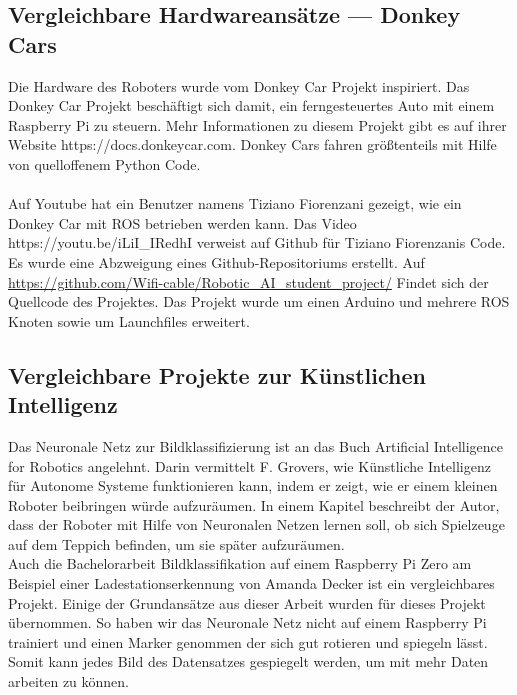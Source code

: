 \documentclass[conference]{IEEEtran}
\begin{document}
	\subsection{Vergleichbare Hardwareansätze — Donkey Cars} %
	Die Hardware des Roboters wurde vom Donkey Car Projekt inspiriert.
	Das Donkey Car Projekt beschäftigt sich damit, ein ferngesteuertes Auto mit einem Raspberry Pi zu steuern.
	Mehr Informationen zu diesem Projekt gibt es auf ihrer Website https://docs.donkeycar.com.
	Donkey Cars fahren größtenteils mit Hilfe von quelloffenem Python Code. \\
	\\
	Auf Youtube hat ein Benutzer namens Tiziano Fiorenzani gezeigt, wie ein Donkey Car mit ROS betrieben werden kann.
	Das Video https://youtu.be/iLiI\_IRedhI verweist auf Github für Tiziano 
	Fiorenzanis Code. Es wurde eine Abzweigung eines Github-Repositoriums 
	erstellt. Auf 
	\url{https://github.com/Wifi-cable/Robotic_AI_student_project/}
	Findet sich der Quellcode des Projektes. 
	Das Projekt wurde um einen Arduino und mehrere ROS Knoten sowie um 
	Launchfiles erweitert.
	
	
	\subsection{Vergleichbare Projekte zur Künstlichen Intelligenz} %
	Das Neuronale Netz zur Bildklassifizierung ist an das Buch \glqq Artificial Intelligence for Robotics\grqq  \cite{govers2018artificial} angelehnt.
	Darin vermittelt F. Grovers, wie Künstliche Intelligenz für Autonome Systeme funktionieren kann, indem er zeigt, wie er einem kleinen Roboter beibringen würde aufzuräumen.
	In einem Kapitel beschreibt der Autor, dass der Roboter mit Hilfe von Neuronalen Netzen lernen soll, ob sich Spielzeuge auf dem Teppich befinden, um sie später aufzuräumen.\\
	
	Auch die Bachelorarbeit \glqq Bildklassifikation auf einem Raspberry Pi Zero am Beispiel einer Ladestationserkennung \grqq \cite{Amanda} von Amanda Decker ist ein vergleichbares Projekt.
	Einige der Grundansätze aus dieser Arbeit wurden für dieses Projekt übernommen.
	So haben wir das Neuronale Netz nicht auf einem Raspberry Pi trainiert und einen Marker genommen der sich gut rotieren und spiegeln lässt.
	Somit kann jedes Bild des Datensatzes gespiegelt werden, um mit mehr Daten arbeiten zu können.
	
\end{document}
